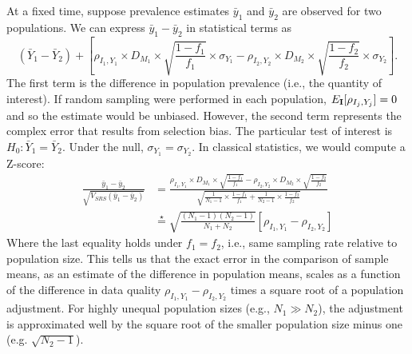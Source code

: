 \documentclass[11pt]{amsart}
\def\I{\bf I}
\begin{document}
At a fixed time, suppose prevalence estimates $\bar y_1$ and $\bar y_2$ are observed for two populations. We can express $\bar y_1 - \bar y_2$ in statistical terms as
$$
(\bar Y_1 - \bar Y_2) + \left[ \rho_{I_1, Y_1} \times D_{M_1} \times \sqrt{\frac{1-f_1}{f_1}} \times \sigma_{Y_1}  - \rho_{I_2, Y_2} \times D_{M_2} \times \sqrt{\frac{1-f_2}{f_2}} \times \sigma_{Y_2} \right].
$$
The first term is the difference in population prevalence (i.e., the quantity of interest).  If random sampling were performed in each population, $E_{\I} [ \rho_{I_j, Y_j}] = 0$ and so the estimate would be unbiased.  However, the second term represents the complex error that results from selection bias.
The particular test of interest is $H_0: \bar Y_1 = \bar Y_2$.  Under the null, $\sigma_{Y_1} = \sigma_{Y_2}$.  In classical statistics, we would compute a Z-score:
$$
\begin{aligned}
\frac{\bar y_1 - \bar y_2}{ \sqrt{V_{SRS} (\bar y_1 - \bar y_2)} } &=
\frac{\rho_{I_1, Y_1} \times D_{M_1} \times \sqrt{\frac{1-f_1}{f_1}}  - \rho_{I_2, Y_2} \times D_{M_2} \times \sqrt{\frac{1-f_2}{f_2}} }{ \sqrt{\frac{1}{N_1 -1} \times \frac{1-f_1}{f_1} + \frac{1}{N_2 - 1} \times \frac{1-f_2}{f_2}} }  \\
&\overset{\star}{=}
\sqrt{\frac{(N_1-1)(N_2 -1)}{N_1 + N_2}} \left[ \rho_{I_1, Y_1} - \rho_{I_2, Y_2} \right]
\end{aligned}
$$
Where the last equality holds under $f_1 = f_2$, i.e., same sampling rate relative to population size. This tells us that the exact error in the comparison of sample means, as an estimate of the difference in population means, scales as a function of the difference in data quality $\rho_{I_1, Y_1} - \rho_{I_2, Y_2}$ times a square root of a population adjustment.  For highly unequal population sizes (e.g., $N_1 \gg N_2$), the adjustment is approximated well by the square root of the smaller population size minus one (e.g. $\sqrt{N_2 -1}$).
\end{document}
